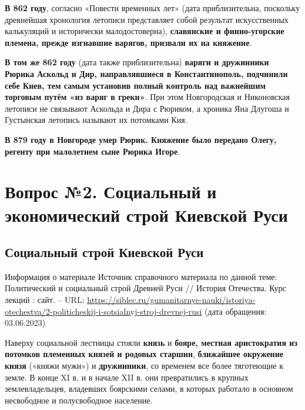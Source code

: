 \documentclass{article}
\begin{document}
\hfill

\textbf{В 862 году}, согласно «Повести временных лет» (дата приблизительна, поскольку древнейшая хронология летописи представляет собой результат искусственных калькуляций и исторически малодостоверна), \textbf{славянские и финно-угорские племена, прежде изгнавшие варягов, призвали их на княжение}.

\textbf{В том же 862 году} (дата также приблизительна) \textbf{варяги и дружинники Рюрика Аскольд и Дир, направлявшиеся в Константинополь, подчинили себе Киев, тем самым установив полный контроль над важнейшим торговым путём «из варяг в греки»}. При этом Новгородская и Никоновская летописи не связывают Аскольда и Дира с Рюриком, а хроника Яна Длугоша и Густынская летопись называют их потомками Кия.

\textbf{В 879 году в Новгороде умер Рюрик. Княжение было передано Олегу, регенту при малолетнем сыне Рюрика Игоре}. 

\pagebreak
\section{Вопрос №2. Социальный и экономический строй Киевской Руси}

\subsection{Социальный строй Киевской Руси}

\begin{bclogo}[logo=\bcinfo, couleurBarre=orange, noborder=true, couleur=white]{Информация о материале}
    Источник справочного материала по данной теме: Политический и социальный строй Древней Руси // История Отечества. Курс лекций : сайт. – URL: \href{https://siblec.ru/gumanitarnye-nauki/istoriya-otechestva/2-politicheskij-i-sotsialnyj-stroj-drevnej-rusi}{https://siblec.ru/gumanitarnye-nauki/istoriya-otechestva/2-politicheskij-i-sotsialnyj-stroj-drevnej-rusi} (дата обращения: 03.06.2023)
\end{bclogo}

Наверху социальной лестницы стояли \textbf{князь} и \textbf{бояре, местная аристократия из потомков племенных князей и родовых старшин}, \textbf{ближайшее окружение князя} («княжи мужи») и \textbf{дружинники}, со временем все более тяготеющие к земле. В конце XI в. и в начале XII в. они превратились в крупных землевладельцев, владевших боярскими селами, в которых работало в основном несвободное и полусвободное население.
\end{document}
